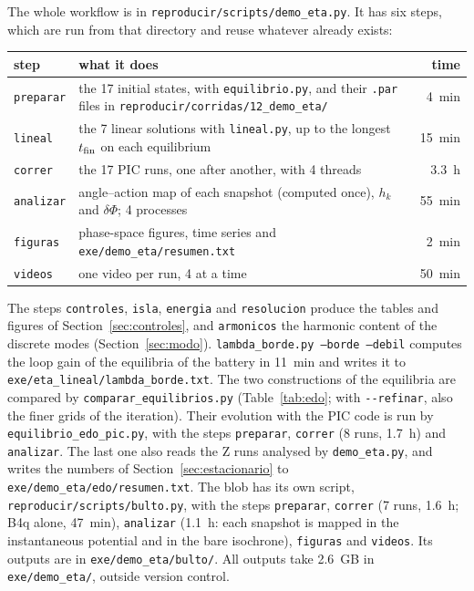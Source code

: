 \documentclass[11pt,a4paper]{article}
\begin{document}
The whole workflow is in \texttt{reproducir/scripts/demo\_eta.py}. It has six steps, which
are run from that directory and reuse whatever already exists:
\begin{center}
\small
\begin{tabular}{lL{9.6cm}r}
\toprule
step & what it does & time\\
\midrule
\texttt{preparar} & the 17 initial states, with \texttt{equilibrio.py}, and their \texttt{.par} files in \texttt{reproducir/corridas/12\_demo\_eta/} & \SI{4}{min}\\
\texttt{lineal} & the 7 linear solutions with \texttt{lineal.py}, up to the longest $t_{\rm fin}$ on each equilibrium & \SI{15}{min}\\
\texttt{correr} & the 17 PIC runs, one after another, with 4 threads & \SI{3.3}{h}\\
\texttt{analizar} & angle--action map of each snapshot (computed once), $h_k$ and $\delta\Phi$; 4 processes & \SI{55}{min}\\
\texttt{figuras} & phase-space figures, time series and \texttt{exe/demo\_eta/resumen.txt} & \SI{2}{min}\\
\texttt{videos} & one video per run, 4 at a time & \SI{50}{min}\\
\bottomrule
\end{tabular}
\end{center}
The steps \texttt{controles}, \texttt{isla}, \texttt{energia} and \texttt{resolucion} produce the
tables and figures of Section~\ref{sec:controles}, and \texttt{armonicos} the harmonic content
of the discrete modes (Section~\ref{sec:modo}). \texttt{lambda\_\allowbreak borde.py --borde --debil}
computes the loop gain of the equilibria of the battery in \SI{11}{min} and writes it to
\texttt{exe/\allowbreak eta\_\allowbreak lineal/\allowbreak lambda\_\allowbreak borde.txt}. The two constructions of the equilibria
are compared by \texttt{comparar\_\allowbreak equilibrios.py} (Table~\ref{tab:edo}; with
\texttt{-{}-refinar}, also the finer grids of the iteration). Their evolution with the PIC code
is run by \texttt{equilibrio\_\allowbreak edo\_\allowbreak pic.py}, with the steps
\texttt{preparar}, \texttt{correr} (8 runs, \SI{1.7}{h}) and \texttt{analizar}. The last one also
reads the Z runs analysed by \texttt{demo\_eta.py}, and writes the numbers of
Section~\ref{sec:estacionario} to \texttt{exe/\allowbreak demo\_\allowbreak eta/\allowbreak edo/\allowbreak resumen.txt}. The blob has its own
script, \texttt{reproducir/scripts/bulto.py}, with the steps \texttt{preparar}, \texttt{correr}
(7 runs, \SI{1.6}{h}; B4q alone, \SI{47}{min}), \texttt{analizar} (\SI{1.1}{h}: each snapshot is
mapped in the instantaneous potential and in the bare isochrone), \texttt{figuras} and
\texttt{videos}. Its outputs are in \texttt{exe/demo\_eta/bulto/}. All outputs take
\SI{2.6}{GB} in \texttt{exe/demo\_eta/}, outside version control.
\end{document}
